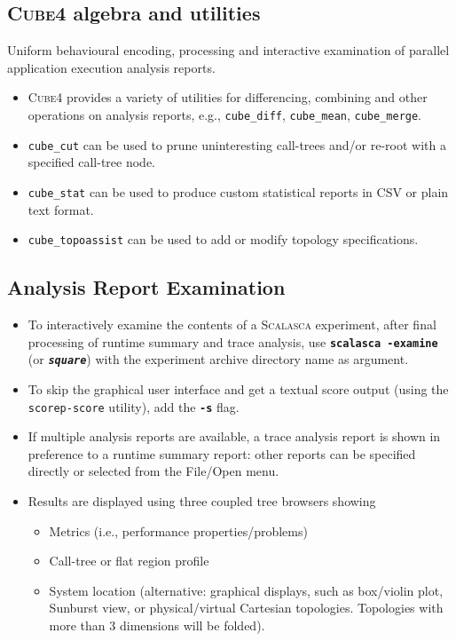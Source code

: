 \documentclass[a4paper]{article}
\newcommand{\Scalasca}{\textsc{Scalasca}\xspace}
\newcommand{\Cube}{\textsc{Cube}\xspace}
\begin{document}
\subsection*{\Cube{4} algebra and utilities}

Uniform behavioural encoding, processing and interactive examination of
parallel application execution analysis reports.

\begin{itemize}
  \item \Cube{4} provides a variety of utilities 
  for differencing, combining and other operations on analysis reports, e.g.,
  \texttt{cube\_diff}, \texttt{cube\_mean}, \texttt{cube\_merge}.
  \item \texttt{cube\_cut} can be used to prune uninteresting
call-trees and/or re-root with a specified call-tree node.
  \item \texttt{cube\_stat} can be used to produce custom statistical reports in CSV or plain text format.
  \item \texttt{cube\_topoassist} can be used to add or modify topology specifications.
\end{itemize}

\clearpage


\subsection*{Analysis Report Examination}
\begin{itemize}
  \item To interactively examine the contents of a \Scalasca experiment,
        after final processing of runtime summary and trace analysis,
        use \textbf{\texttt{scalasca -examine}} (or \textbf{\texttt{\em square}}) with the
        experiment archive directory name as argument.
  \item To skip the graphical user interface and get a textual score output (using the 
        \texttt{scorep-score} utility), add the \textbf{\texttt{-s}} flag.
  \item If multiple analysis reports are available, 
        a trace analysis report is shown in preference to a runtime
        summary report: other reports can be specified directly or selected
        from the File/Open menu.
  \item Results are displayed using three coupled tree browsers showing
    \begin{itemize}
      \setlength{\itemsep}{0cm}
      \item Metrics (i.e., performance properties/problems)
      \item Call-tree or flat region profile
      \item System location (alternative: graphical displays, such as
            box/violin plot, Sunburst view, or physical/virtual Cartesian
            topologies. Topologies with more than 3 dimensions will be folded).
    \end{itemize}
\end{itemize}
\end{document}

